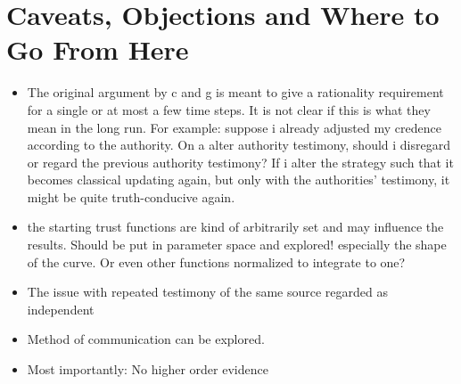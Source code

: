 \documentclass[11pt, a4paper]{article}
\begin{document}
\section{Caveats, Objections and Where to Go From Here}
\begin{itemize}
    \item The original argument by c and g is meant to give a rationality requirement for a single or at most a few time steps. It is not clear if this is what they mean in the long run. For example: suppose i already adjusted my credence according to the authority. On a alter authority testimony, should i disregard or regard the previous authority testimony? If i alter the strategy such that it becomes classical updating again, but only with the authorities' testimony, it might be quite truth-conducive again.

    \item the starting trust functions are kind of arbitrarily set and may influence the results. Should be put in parameter space and explored! especially the shape of the curve. Or even other functions normalized to integrate to one?
    \item The issue with repeated testimony of the same source regarded as independent
    \item Method of communication can be explored.
    \item Most importantly: No higher order evidence
\end{itemize}

\printbibliography{}
\end{document}
